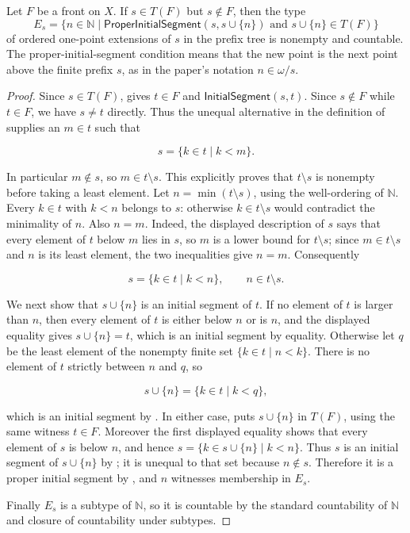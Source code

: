 \begin{lemma}
Let $F$ be a front on $X$.  If $s\in T(F)$ but $s\notin F$, then the type
\[
  E_s=\{n\in\mathbb N\mid
  \mathsf{ProperInitialSegment}(s,s\cup\{n\})
  \text{ and }s\cup\{n\}\in T(F)\}
\]
of ordered one-point extensions of $s$ in the prefix tree is nonempty and
countable.  The proper-initial-segment condition means that the new point is
the next point above the finite prefix $s$, as in the paper's notation
$n\in\omega/s$.
\end{lemma}
\begin{proof}
Since $s\in T(F)$,  gives $t\in F$ and
$\mathsf{InitialSegment}(s,t)$.  Since $s\notin F$ while $t\in F$, we have
$s\ne t$ directly.  Thus the unequal alternative in the definition of
 supplies an $m\in t$ such that

\[
  s=\{k\in t\mid k<m\}.
\]

In particular $m\notin s$, so $m\in t\setminus s$.  This explicitly proves
that $t\setminus s$ is nonempty before taking a least element.  Let
$n=\min(t\setminus s)$, using the well-ordering of $\mathbb N$.  Every
$k\in t$ with $k<n$ belongs to $s$: otherwise $k\in t\setminus s$ would
contradict the minimality of $n$.  Also $n=m$.  Indeed, the displayed
description of $s$ says that every element of $t$ below $m$ lies in $s$, so
$m$ is a lower bound for $t\setminus s$; since $m\in t\setminus s$ and $n$
is its least element, the two inequalities give $n=m$.  Consequently

\[
  s=\{k\in t\mid k<n\},\qquad n\in t\setminus s.
\]

We next show that $s\cup\{n\}$ is an initial segment of $t$.  If no element
of $t$ is larger than $n$, then every element of $t$ is either below $n$ or
is $n$, and the displayed equality gives $s\cup\{n\}=t$, which is an
initial segment by equality.  Otherwise let $q$ be the least element of the
nonempty finite set $\{k\in t\mid n<k\}$.  There is no element of $t$
strictly between $n$ and $q$, so

\[
  s\cup\{n\}=\{k\in t\mid k<q\},
\]

which is an initial segment by .  In either case,
 puts $s\cup\{n\}$ in $T(F)$, using the same witness
$t\in F$.  Moreover the first displayed equality shows that every element
of $s$ is below $n$, and hence
$s=\{k\in s\cup\{n\}\mid k<n\}$.  Thus $s$ is an initial segment of
$s\cup\{n\}$ by ; it is unequal to that set because
$n\notin s$.  Therefore it is a proper initial segment by
, and $n$ witnesses membership in $E_s$.

Finally $E_s$ is a subtype of $\mathbb N$, so it is countable by the
standard countability of $\mathbb N$ and closure of countability under
subtypes.
\end{proof}

